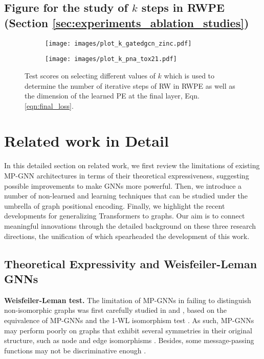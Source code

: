 \documentclass{article} \usepackage{iclr2021_conference,times}
\begin{document}
\subsection{Figure for the study of $k$ steps in RWPE (Section \ref{sec:experiments_ablation_studies})}
\label{sec:figure_k_study}

\begin{figure}[h]
\centering
  \begin{subfigure}{0.42\linewidth}
  \centering
    \texttt{[image: images/plot\_k\_gatedgcn\_zinc.pdf]}
    \label{fig:k_plot_ZINC}
  \end{subfigure}
  \begin{subfigure}{0.40\linewidth}
  \centering
    \texttt{[image: images/plot\_k\_pna\_tox21.pdf]}
    \label{fig:k_plot_TOX21}
  \end{subfigure}
  \vspace{-16pt}
  \caption{Test scores on selecting different values of $k$ which is used to determine the number of iterative steps of RW in RWPE as well as the dimension of the learned PE at the final layer, Eqn. \ref{eqn:final_loss}.}
  \label{fig:k_plots}
  \vspace{-12pt}
\end{figure}


\section{Related work in Detail}
\label{sec:related_work_detailed}

In this detailed section on related work, we first review the limitations of existing MP-GNN architectures in terms of their theoretical expressiveness, suggesting possible improvements to make GNNs more powerful. Then, we introduce a number of  non-learned and learning techniques that can be studied under the umbrella of graph positional encoding. Finally, we highlight the recent developments for generalizing Transformers to graphs. Our aim is to connect meaningful innovations through the detailed background on these three research directions, the unification of which spearheaded the development of this work.



\subsection{Theoretical Expressivity and Weisfeiler-Leman GNNs}
\label{sec:related_work_theory}
{\bf Weisfeiler-Leman test.} The limitation of MP-GNNs in failing to distinguish non-isomorphic graphs was first carefully studied in \cite{xu2018how} and \cite{morris2019weisfeiler}, based on the equivalence of MP-GNNs and the 1-WL isomorphism test \citep{weisfeiler1968reduction}. As such, MP-GNNs may perform poorly on graphs that exhibit several symmetries in their original structure, such as node and edge isomorphisms \citep{murphy2019relational, srinivasan2019equivalence}. Besides, some message-passing functions may not be discriminative enough \citep{xu2018how,corso2020principal}.
\end{document}
